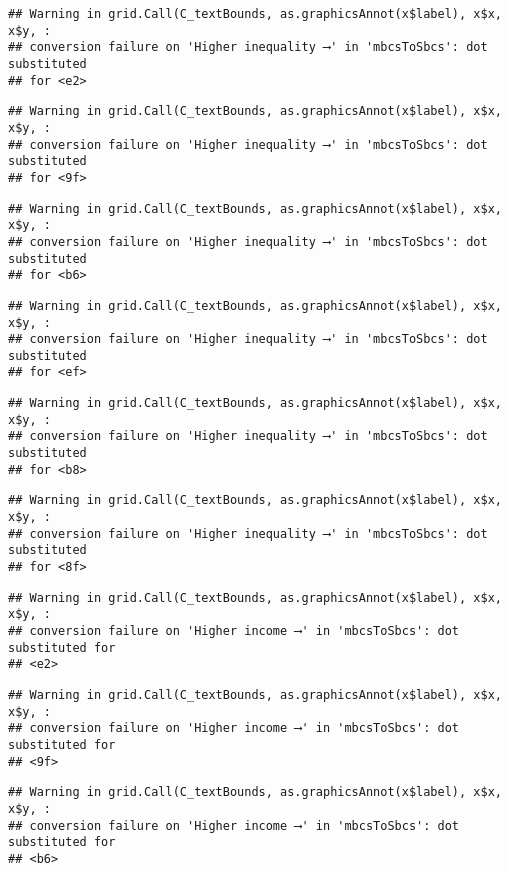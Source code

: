 \documentclass[
]{article}
\begin{document}
\begin{verbatim}
## Warning in grid.Call(C_textBounds, as.graphicsAnnot(x$label), x$x, x$y, :
## conversion failure on 'Higher inequality ⟶️' in 'mbcsToSbcs': dot substituted
## for <e2>
\end{verbatim}

\begin{verbatim}
## Warning in grid.Call(C_textBounds, as.graphicsAnnot(x$label), x$x, x$y, :
## conversion failure on 'Higher inequality ⟶️' in 'mbcsToSbcs': dot substituted
## for <9f>
\end{verbatim}

\begin{verbatim}
## Warning in grid.Call(C_textBounds, as.graphicsAnnot(x$label), x$x, x$y, :
## conversion failure on 'Higher inequality ⟶️' in 'mbcsToSbcs': dot substituted
## for <b6>
\end{verbatim}

\begin{verbatim}
## Warning in grid.Call(C_textBounds, as.graphicsAnnot(x$label), x$x, x$y, :
## conversion failure on 'Higher inequality ⟶️' in 'mbcsToSbcs': dot substituted
## for <ef>
\end{verbatim}

\begin{verbatim}
## Warning in grid.Call(C_textBounds, as.graphicsAnnot(x$label), x$x, x$y, :
## conversion failure on 'Higher inequality ⟶️' in 'mbcsToSbcs': dot substituted
## for <b8>
\end{verbatim}

\begin{verbatim}
## Warning in grid.Call(C_textBounds, as.graphicsAnnot(x$label), x$x, x$y, :
## conversion failure on 'Higher inequality ⟶️' in 'mbcsToSbcs': dot substituted
## for <8f>
\end{verbatim}

\begin{verbatim}
## Warning in grid.Call(C_textBounds, as.graphicsAnnot(x$label), x$x, x$y, :
## conversion failure on 'Higher income ⟶️' in 'mbcsToSbcs': dot substituted for
## <e2>
\end{verbatim}

\begin{verbatim}
## Warning in grid.Call(C_textBounds, as.graphicsAnnot(x$label), x$x, x$y, :
## conversion failure on 'Higher income ⟶️' in 'mbcsToSbcs': dot substituted for
## <9f>
\end{verbatim}

\begin{verbatim}
## Warning in grid.Call(C_textBounds, as.graphicsAnnot(x$label), x$x, x$y, :
## conversion failure on 'Higher income ⟶️' in 'mbcsToSbcs': dot substituted for
## <b6>
\end{verbatim}
\end{document}
